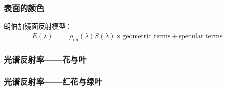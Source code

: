 \documentclass{beamer}
\newcommand{\tmop}[1]{\ensuremath{\operatorname{#1}}}
\begin{document}
{{\begin{frame}
  \qquad{}
\end{frame}}{\begin{frame}
  \frametitle{表面的颜色}
  
  朗伯加镜面反射模型：
  \begin{eqnarray*}
    E (\lambda) & = & \rho_{\tmop{dh}} (\lambda) S (\lambda) \times
    \text{geometric terms} + \text{specular terms}
  \end{eqnarray*}
\end{frame}}{\begin{frame}
  \frametitle{光谱反射率------花与叶}
  
  \qquad{}
\end{frame}}{\begin{frame}
  \frametitle{光谱反射率------红花与绿叶}
  

\end{frame}}}
\end{document}

